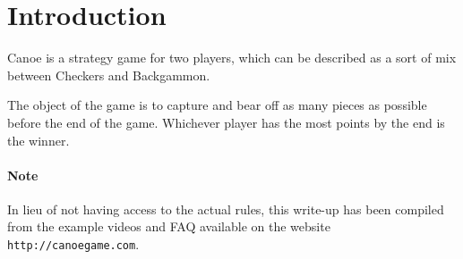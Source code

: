 \section{Introduction}
Canoe is a strategy game for two players, which can be described as a sort of mix between Checkers and Backgammon.

The object of the game is to capture and bear off as many pieces as possible before the end of the game.
Whichever player has the most points by the end is the winner.

\paragraph{Note} In lieu of not having access to the actual rules, this write-up has been compiled from the example videos and FAQ available on the website \texttt{http://canoegame.com}.